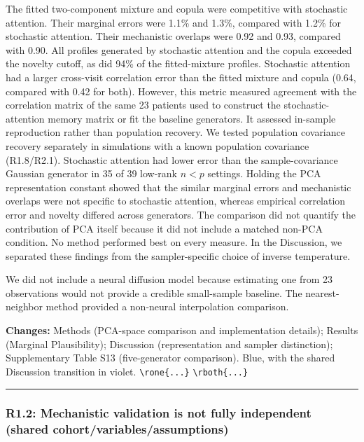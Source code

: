 \documentclass[
  11pt,
  letterpaper,
]{article}
\begin{document}
The fitted two-component mixture and copula were competitive with stochastic attention. Their marginal errors were 1.1\% and 1.3\%, compared with 1.2\% for stochastic attention. Their mechanistic overlaps were 0.92 and 0.93, compared with 0.90. All profiles generated by stochastic attention and the copula exceeded the novelty cutoff, as did 94\% of the fitted-mixture profiles. Stochastic attention had a larger cross-visit correlation error than the fitted mixture and copula (0.64, compared with 0.42 for both). However, this metric measured agreement with the correlation matrix of the same 23 patients used to construct the stochastic-attention memory matrix or fit the baseline generators. It assessed in-sample reproduction rather than population recovery. We tested population covariance recovery separately in simulations with a known population covariance (R1.8/R2.1). Stochastic attention had lower error than the sample-covariance Gaussian generator in 35 of 39 low-rank \(n<p\) settings. Holding the PCA representation constant showed that the similar marginal errors and mechanistic overlaps were not specific to stochastic attention, whereas empirical correlation error and novelty differed across generators. The comparison did not quantify the contribution of PCA itself because it did not include a matched non-PCA condition. No method performed best on every measure. In the Discussion, we separated these findings from the sampler-specific choice of inverse temperature.

We did not include a neural diffusion model because estimating one from 23 observations would not provide a credible small-sample baseline. The nearest-neighbor method provided a non-neural interpolation comparison.

\textbf{Changes:} Methods (PCA-space comparison and implementation details); Results (Marginal Plausibility); Discussion (representation and sampler distinction); Supplementary Table S13 (five-generator comparison). Blue, with the shared Discussion transition in violet. \texttt{\textbackslash{}rone\{...\}} \texttt{\textbackslash{}rboth\{...\}}

\begin{center}\rule{0.5\linewidth}{0.5pt}\end{center}

\subsubsection{R1.2: Mechanistic validation is not fully independent (shared cohort/variables/assumptions)}\label{r12-mechanistic-validation-is-not-fully-independent-shared-cohortvariablesassumptions}
\end{document}
